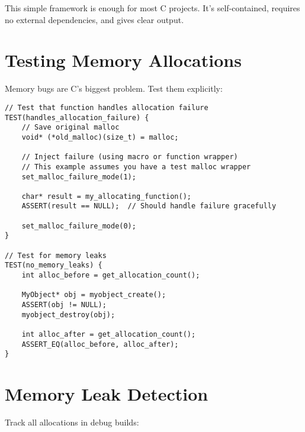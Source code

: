 \begin{tipbox}
This simple framework is enough for most C projects. It's self-contained, requires no external dependencies, and gives clear output.
\end{tipbox}

\section{Testing Memory Allocations}

Memory bugs are C's biggest problem. Test them explicitly:

\begin{lstlisting}
// Test that function handles allocation failure
TEST(handles_allocation_failure) {
    // Save original malloc
    void* (*old_malloc)(size_t) = malloc;

    // Inject failure (using macro or function wrapper)
    // This example assumes you have a test malloc wrapper
    set_malloc_failure_mode(1);

    char* result = my_allocating_function();
    ASSERT(result == NULL);  // Should handle failure gracefully

    set_malloc_failure_mode(0);
}

// Test for memory leaks
TEST(no_memory_leaks) {
    int alloc_before = get_allocation_count();

    MyObject* obj = myobject_create();
    ASSERT(obj != NULL);
    myobject_destroy(obj);

    int alloc_after = get_allocation_count();
    ASSERT_EQ(alloc_before, alloc_after);
}
\end{lstlisting}

\section{Memory Leak Detection}

Track all allocations in debug builds:


